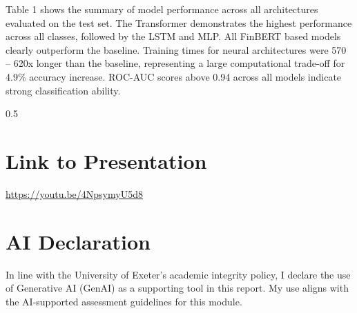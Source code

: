 \documentclass[english]{article}
\begin{document}
\vspace{-3em}

\begin{table}[H]
\centering

\vspace{-1em}
Table 1 shows the summary of model performance across all architectures evaluated on the test set. The Transformer demonstrates the highest performance
across all classes, followed by the LSTM and MLP. All FinBERT based models clearly outperform the baseline. Training times for neural architectures were
570 -- 620x longer than the baseline, representing a large computational trade-off for 4.9\% accuracy increase. ROC-AUC scores above 0.94 across all
models indicate strong classification ability.
\end{table}



\clearpage
\begin{spacing}{0.5}
    
    
\end{spacing}

\vspace{-1em}

\section*{Link to Presentation}

\vspace{-0.5em}

\url{https://youtu.be/4NpsymyU5d8}

\vspace{-1em}

\section*{AI Declaration}

\vspace{-0.5em}

In line with the University of Exeter's academic integrity policy, 
I declare the use of Generative AI (GenAI) as a supporting tool in this report.
My use aligns with the AI-supported assessment guidelines for this module.
\end{document}
